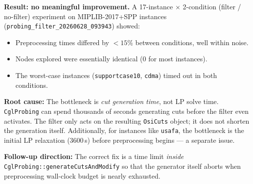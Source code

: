 \documentclass[11pt,a4paper]{article}
\begin{document}
\textbf{Result: no meaningful improvement.}
A 17-instance $\times$ 2-condition (filter / no-filter) experiment on MIPLIB-2017+SPP
instances (\texttt{probing\_filter\_20260628\_093943}) showed:

\begin{itemize}
  \item Preprocessing times differed by $<15\%$ between conditions, well within noise.
  \item Nodes explored were essentially identical (0 for most instances).
  \item The worst-case instances (\texttt{supportcase10}, \texttt{cdma}) timed out in
        both conditions.
\end{itemize}

\textbf{Root cause:} The bottleneck is \emph{cut generation time}, not LP solve time.
\texttt{CglProbing} can spend thousands of seconds generating cuts before the filter even
activates.  The filter only acts on the resulting \texttt{OsiCuts} object; it does not
shorten the generation itself.  Additionally, for instances like \texttt{usafa}, the
bottleneck is the initial LP relaxation (3600\,s) before preprocessing begins — a separate
issue.

\textbf{Follow-up direction:} The correct fix is a time limit \emph{inside}
\texttt{CglProbing::generateCutsAndModify} so that the generator itself aborts when
preprocessing wall-clock budget is nearly exhausted.
\end{document}
